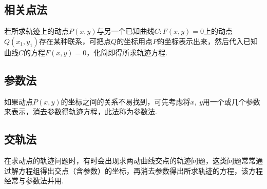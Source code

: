 \documentclass{BHCexam}
\begin{document}
\subsection{相关点法}
若所求轨迹上的动点$ P(x,y) $与另一个已知曲线$ C:F(x,y)=0 $上的动点$ Q(x_1,y_1) $存在某种联系，可把点$ Q $的坐标用点$ P $的坐标表示出来，然后代入已知曲线$ C $的方程$ F(x,y)=0 $，化简即得所求轨迹方程.
\subsection{参数法}
如果动点$ P(x,y) $的坐标之间的关系不易找到，可先考虑将$ x,\ y $用一个或几个参数来表示，消去参数得轨迹方程，此法称为参数法.
\subsection{交轨法}
在求动点的轨迹问题时，有时会出现求两动曲线交点的轨迹问题，这类问题常常通过解方程组得出交点（含参数）的坐标，再消去参数得出所求轨迹的方程，该方程经常与参数法并用.
\end{document}
